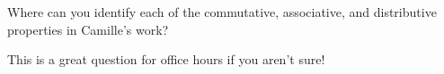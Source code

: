 \documentclass{ximera}
\begin{document}
\begin{question}
Where can you identify each of the commutative, associative, and distributive properties in Camille's work?
\begin{freeResponse}
This is a great question for office hours if you aren't sure!
\end{freeResponse}
\end{question}
\end{document}

